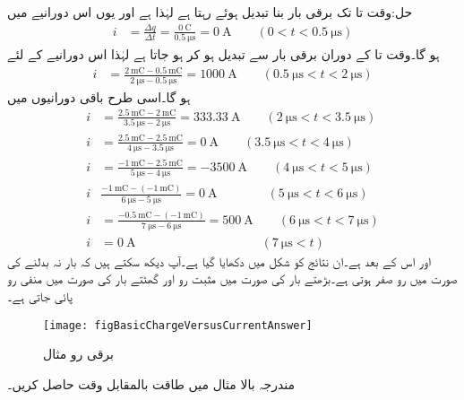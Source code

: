 حل:وقت  تا  تک برقی بار بنا تبدیل ہوئے  رہتا ہے لہٰذا   ہے اور یوں اس دورانیے میں
\begin{align*}
i&=\frac{\Delta q}{\Delta t}=\frac{\SI{0}{\coulomb}}{\SI{0.5}{\micro\second}}=\SI{0}{\ampere} \quad \quad (0<t<\SI{0.5}{\micro\second})
\end{align*} 
ہو گا۔وقت  تا  کے دوران برقی بار  سے تبدیل ہو کر  ہو جاتا ہے لہٰذا اس دورانیے کے لئے
\begin{align*}
i&=\frac{\SI{2}{\milli\coulomb}-\SI{0.5}{\milli \coulomb}}{\SI{2}{\micro\second}-\SI{0.5}{\micro\second}}=\SI{1000}{\ampere}\quad \quad (\SI{0.5}{\micro\second}<t<\SI{2}{\micro\second})
\end{align*} 
ہو گا۔اسی طرح باقی  دورانیوں میں
\begin{align*}
i&=\frac{\SI{2.5}{\milli\coulomb}-\SI{2}{\milli \coulomb}}{\SI{3.5}{\micro\second}-\SI{2}{\micro\second}}=\SI{333.33}{\ampere}\quad \quad (\SI{2}{\micro\second}<t<\SI{3.5}{\micro\second})\\
i&=\frac{\SI{2.5}{\milli\coulomb}-\SI{2.5}{\milli \coulomb}}{\SI{4}{\micro\second}-\SI{3.5}{\micro\second}}=\SI{0}{\ampere}\quad \quad (\SI{3.5}{\micro\second}<t<\SI{4}{\micro\second})\\
i&=\frac{\SI{-1}{\milli\coulomb}-\SI{2.5}{\milli \coulomb}}{\SI{5}{\micro\second}-\SI{4}{\micro\second}}=\SI{-3500}{\ampere}\quad \quad (\SI{4}{\micro\second}<t<\SI{5}{\micro\second})\\
i&\frac{\SI{-1}{\milli\coulomb}-(\SI{-1}{\milli\coulomb})}{\SI{6}{\micro\second}-\SI{5}{\micro\second}}=\SI{0}{\ampere}\quad \quad\quad \quad (\SI{5}{\micro\second}<t<\SI{6}{\micro\second})\\
i&=\frac{\SI{-0.5}{\milli\coulomb}-(\SI{-1}{\milli \coulomb})}{\SI{7}{\micro\second}-\SI{6}{\micro\second}}=\SI{500}{\ampere}\quad \quad (\SI{6}{\micro\second}<t<\SI{7}{\micro\second})\\
i&=\SI{0}{\ampere}\quad \quad\quad \quad\quad \quad\quad \quad\quad \quad (\SI{7}{\micro\second}<t)
\end{align*} 
اور اس کے بعد  ہے۔ان نتائج کو شکل  میں دکھایا گیا ہے۔آپ دیکھ سکتے ہیں کہ بار نہ بدلنے کی صورت میں رو صفر ہوتی ہے۔بڑھتے بار کی صورت میں مثبت رو اور گھٹتے بار کی صورت میں منفی رو پائی جاتی ہے۔

\begin{figure}
\centering
\texttt{[image: figBasicChargeVersusCurrentAnswer]}
\caption{برقی رو مثال }
\label{شکل_بنیادی_برقی_رو_مثال}
\end{figure}
مندرجہ بالا مثال میں طاقت بالمقابل وقت حاصل کریں۔

